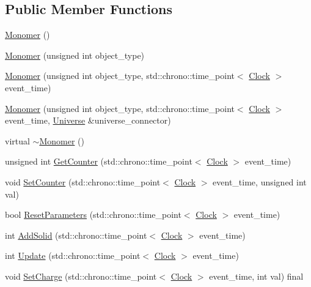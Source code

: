 \subsection*{Public Member Functions}
\begin{DoxyCompactItemize}
\item 
\hyperlink{class_monomer_a2b1f69caca47d8597e43300ae7076095}{Monomer} ()
\item 
\hyperlink{class_monomer_af2249bf76132ee3802eaccb49b76fb96}{Monomer} (unsigned int object\+\_\+type)
\item 
\hyperlink{class_monomer_acab23e1c41e236417492da5c1e617b1a}{Monomer} (unsigned int object\+\_\+type, std\+::chrono\+::time\+\_\+point$<$ \hyperlink{universe_8h_a0ef8d951d1ca5ab3cfaf7ab4c7a6fd80}{Clock} $>$ event\+\_\+time)
\item 
\hyperlink{class_monomer_ae2b80466a0e724125aee173df34d1a6c}{Monomer} (unsigned int object\+\_\+type, std\+::chrono\+::time\+\_\+point$<$ \hyperlink{universe_8h_a0ef8d951d1ca5ab3cfaf7ab4c7a6fd80}{Clock} $>$ event\+\_\+time, \hyperlink{class_universe}{Universe} \&universe\+\_\+connector)
\item 
virtual \hyperlink{class_monomer_a802bf239fc55d16783736393edbd6899}{$\sim$\+Monomer} ()
\item 
unsigned int \hyperlink{class_monomer_a4651a4bd0a41d0698821421043e41126}{Get\+Counter} (std\+::chrono\+::time\+\_\+point$<$ \hyperlink{universe_8h_a0ef8d951d1ca5ab3cfaf7ab4c7a6fd80}{Clock} $>$ event\+\_\+time)
\item 
void \hyperlink{class_monomer_a6f0dfa4382b3d4fa19b7ee0fb8fe7a55}{Set\+Counter} (std\+::chrono\+::time\+\_\+point$<$ \hyperlink{universe_8h_a0ef8d951d1ca5ab3cfaf7ab4c7a6fd80}{Clock} $>$ event\+\_\+time, unsigned int val)
\item 
bool \hyperlink{class_monomer_a16a692cf11117581c9b4ebbed3c04c9c}{Reset\+Parameters} (std\+::chrono\+::time\+\_\+point$<$ \hyperlink{universe_8h_a0ef8d951d1ca5ab3cfaf7ab4c7a6fd80}{Clock} $>$ event\+\_\+time)
\item 
int \hyperlink{class_monomer_ac03023c0d1bb67e5f11091af7ad3735d}{Add\+Solid} (std\+::chrono\+::time\+\_\+point$<$ \hyperlink{universe_8h_a0ef8d951d1ca5ab3cfaf7ab4c7a6fd80}{Clock} $>$ event\+\_\+time)
\item 
int \hyperlink{class_monomer_a48dc2ffb5da8cf3dc3f4f56bba674de6}{Update} (std\+::chrono\+::time\+\_\+point$<$ \hyperlink{universe_8h_a0ef8d951d1ca5ab3cfaf7ab4c7a6fd80}{Clock} $>$ event\+\_\+time)
\item 
void \hyperlink{class_monomer_a1ee35c888318e590082e6cd1772bb430}{Set\+Charge} (std\+::chrono\+::time\+\_\+point$<$ \hyperlink{universe_8h_a0ef8d951d1ca5ab3cfaf7ab4c7a6fd80}{Clock} $>$ event\+\_\+time, int val) final

\end{DoxyCompactItemize}
